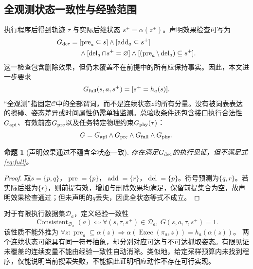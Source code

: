 \documentclass[UTF8,zihao=-4,fontset=fandol,a4paper]{ctexart}
\newtheorem{proposition}{命题}
\newcommand{\C}{\mathcal{C}}
\newcommand{\D}{\mathcal{D}}
\newcommand{\pre}{\operatorname{pre}}
\newcommand{\add}{\operatorname{add}}
\newcommand{\del}{\operatorname{del}}
\begin{document}
\subsection{全观测状态一致性与经验范围}
执行程序后得到轨迹 $\tau$ 与实际后继状态 $s^{+}=\alpha(z^{+})$。声明效果检查可写为
\begin{equation}
\begin{split}
    G_{\rm dec}={}&[\pre_a\subseteq s]\land[\add_a\subseteq s^{+}]\\
    &\land[\del_a\cap s^{+}=\varnothing]
    \land[(\pre_a\setminus\del_a)\subseteq s^{+}].
\end{split}
\end{equation}
这一检查包含删除效果，但仍未覆盖不在前提中的所有应保持事实。因此，本文进一步要求
\begin{equation}
    G_{\rm full}(s,a,s^{+})=[s^{+}=h_a(s)].
    \label{eq:full}
\end{equation}
“全观测”指固定$\C$中的全部谓词，而不是连续状态$z$的所有分量。没有被词表表达的擦碰、姿态差异或时间属性仍需单独监测。总验收条件还包含接口执行合法性$G_{\rm api}$、有效前态$G_{\rm pre}$以及任务特定物理约束$G_{\rm phy}(\tau)$：
\begin{equation}
    G=G_{\rm api}\land G_{\rm pre}\land G_{\rm full}\land G_{\rm phy}.
    \label{eq:gate}
\end{equation}

\begin{proposition}[声明效果通过不蕴含全状态一致]
存在满足$G_{\rm dec}$的执行见证，但不满足式\eqref{eq:full}。
\end{proposition}
\begin{proof}
取$s=\{p,q\}$，$\pre=\{p\}$，$\add=\{r\}$，$\del=\{p\}$。符号预测为$\{q,r\}$。若实际后继为$\{r\}$，则前提有效，增加与删除效果均满足，保留前提集合为空，故声明效果检查通过；但未声明的$q$丢失，因此全状态等式不成立。
\end{proof}

对于有限执行数据集$\D_a$，定义经验一致性
\begin{equation}
    \operatorname{Consistent}_{\D_a}(a)
    \iff \forall(s,\tau,s^{+})\in\D_a,\ G(s,a,\tau,s^{+})=1.
\end{equation}
该性质不能外推为
$\forall z:\pre_a\subseteq\alpha(z)\Rightarrow\alpha(\operatorname{Exec}(\pi_a,z))=h_a(\alpha(z))$。
两个连续状态可能具有同一符号抽象，却分别对应可达与不可达抓取姿态。有限见证未覆盖的连续变量不能由经验一致性自动消除。类似地，给定采样预算内未找到程序，仅能说明当前搜索失败，不能据此证明相应动作不存在可行实现。
\end{document}
